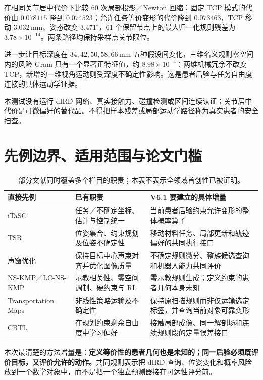 \documentclass[UTF8,11pt,a4paper,fontset=fandol]{ctexart}
\numberwithin{equation}{section}
\theoremstyle{definition}
\begin{document}
在相同关节居中代价下比较 60 次局部投影／Newton 回缩：固定 TCP 模式的代价由 $0.078115$ 降到 $0.074523$；允许任务等价变形的代价降到 $0.073463$，TCP 移动 $3.032\,\mathrm{mm}$、姿态改变 $3.471^\circ$，61 个保留节点上的最大归一化规则残差为 $3.78\times10^{-14}$。两条路径均保持采样点关节限位。

进一步让目标深度在 $34,42,50,58,66\,\mathrm{mm}$ 五种假设间变化，三维名义规则零空间内的风险 Gram 只有一个显著正特征值，约 $8.98\times10^{-4}$：两维机械冗余不改变 TCP，新增的一维视角运动则受深度不确定性影响。这是患者后验与任务自由度连接的具体运动学证据。

本测试没有运行 dIRD 网络、真实接触力、碰撞检测或区间连续认证；关节居中代价是可微偏好的替代品。不得把样本残差或局部运动学路径称为真实患者的安全扫查。

\section{先例边界、适用范围与论文门槛}
\label{sec:novelty}
\begin{table}[ht]\centering\small
\begin{tabularx}{\linewidth}{p{.22\linewidth}YY}
\toprule
直接先例 & 已有职责 & V6.1 要建立的具体增量\\\midrule
 iTaSC\cite{itasc} & 任务／不确定坐标、估计与控制统一 & 当前患者后验约束允许变形的整体概率算子\\
 TSR\cite{tsr} & 位姿集合、约束规划及位姿不确定性 & 移动材料任务、局部更新和轨迹偏好的共同执行接口\\
 声窗优化\cite{chatelain} & 保持目标中心声束对齐并优化图像质量 & 不确定规则微分、整族候选查询和机器人能力共同评价\\
 NS-KMP／LC-NS-KMP\cite{nskmp,lcns} & 示教相关性、零空间调制、硬约束与 RL & 零示教规则生成；定义约束的患者几何本身未知\\
 Transportation Maps\cite{transport} & 非线性策略运输及不确定性 & 保持原扫描规则而非仅运输选定标签，并查询当前对象可靠变形\\
 CBTL\cite{cbtl} & 在规划约束剩余自由度中学习偏好 & 接触局部成像、同一解剖场和连续规则段的定量误差接口\\
\bottomrule
\end{tabularx}
\caption{部分文献同时覆盖多个栏目的职责；本表不表示全领域首创性已被证明。}
\end{table}

本次最清楚的方法增量是：\textbf{定义等价性的患者几何也是未知的；同一后验必须既评价目标，又评价允许的动作。}共同规则表示把 dIRD 查询、位姿变化和概率风险放到一个数学对象中，而不是把一个独立预测器接在可达性评分前。
\end{document}
